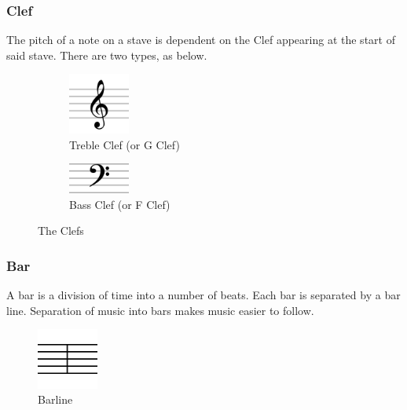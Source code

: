         \subsubsection{Clef}
            The pitch of a note on a stave is dependent on the Clef appearing at the start of said stave. There are two types, as below.  
            \begin{figure}[h!]
                \centering
                \begin{subfigure}{0.4\textwidth}
                    \centering
                    \includegraphics[width=20mm]{./assets/trebleclef.png}
                    \caption{Treble Clef (or G Clef)}
                    \label{image:trebleclef}
                \end{subfigure}
                \begin{subfigure}{0.4\textwidth}
                    \centering
                    \includegraphics[width=20mm]{./assets/bassclef.png}
                    \caption{Bass Clef (or F Clef)}
                    \label{image:bassclef}
                \end{subfigure}
                \caption{The Clefs}
                \label{image:clefs}
            \end{figure}
        \subsubsection{Bar}
            A bar is a division of time into a number of beats. Each bar is separated by a bar line.
            Separation of music into bars makes music easier to follow.
            \begin{figure}[h!]
                \centering
                \includegraphics[width=20mm]{./assets/barline.png}
                \caption{Barline}
                \label{image:barline}
            \end{figure}
